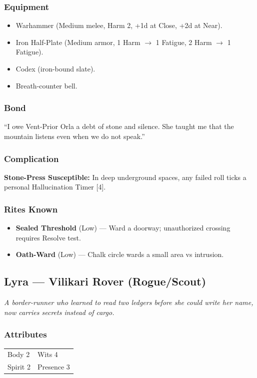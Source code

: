 \subsubsection*{Equipment}
\begin{itemize}
  \item Warhammer (Medium melee, Harm 2, +1d at Close, +2d at Near).
  \item Iron Half-Plate (Medium armor, 1 Harm $\rightarrow$ 1 Fatigue, 2 Harm $\rightarrow$ 1 Fatigue).
  \item Codex (iron-bound slate).
  \item Breath-counter bell.
\end{itemize}

\subsubsection*{Bond}
``I owe Vent-Prior Orla a debt of stone and silence. She taught me that the mountain listens even when we do not speak.''

\subsubsection*{Complication}
\textbf{Stone-Press Susceptible:} In deep underground spaces, any failed roll ticks a personal Hallucination Timer [4].

\subsubsection*{Rites Known}
\begin{itemize}
  \item \textbf{Sealed Threshold} (Low) --- Ward a doorway; unauthorized crossing requires Resolve test.
  \item \textbf{Oath-Ward} (Low) --- Chalk circle wards a small area vs intrusion.
\end{itemize}

\subsection{Lyra --- Vilikari Rover (Rogue/Scout)}

\textit{A border-runner who learned to read two ledgers before she could write her name, now carries secrets instead of cargo.}

\subsubsection*{Attributes}
\begin{tabular}{@{}ll@{}}
Body 2 & Wits 4 \\
Spirit 2 & Presence 3 \\
\end{tabular}

